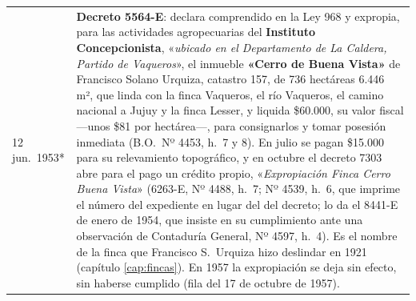 \begin{longtable}{@{}p{2.7cm}p{10.3cm}@{}}
12 jun.\ 1953* & \textbf{Decreto 5564-E}: declara comprendido en la Ley 968 y expropia, para las actividades agropecuarias del \textbf{Instituto Concepcionista}, «\textit{ubicado en el Departamento de La Caldera, Partido de Vaqueros}», el inmueble \textbf{«Cerro de Buena Vista»} de Francisco Solano Urquiza\index{Urquiza, Francisco S.}, catastro 157, de 736 hectáreas 6.446 m², que linda con la finca Vaqueros, el río Vaqueros, el camino nacional a Jujuy y la finca Lesser, y liquida \$60.000, su valor fiscal ---unos \$81 por hectárea---, para consignarlos y tomar posesión inmediata (B.O.\ Nº 4453, h.\ 7 y 8). En julio se pagan \$15.000 para su relevamiento topográfico, y en octubre el decreto 7303 abre para el pago un crédito propio, «\textit{Expropiación Finca Cerro Buena Vista}» (6263-E, Nº 4488, h.\ 7; Nº 4539, h.\ 6, que imprime el número del expediente en lugar del del decreto; lo da el 8441-E de enero de 1954, que insiste en su cumplimiento ante una observación de Contaduría General, Nº 4597, h.\ 4). Es el nombre de la finca que Francisco S.\ Urquiza hizo deslindar en 1921 (capítulo \ref{cap:fincas}). En 1957 la expropiación se deja sin efecto, sin haberse cumplido (fila del 17 de octubre de 1957). \\

\end{longtable}
